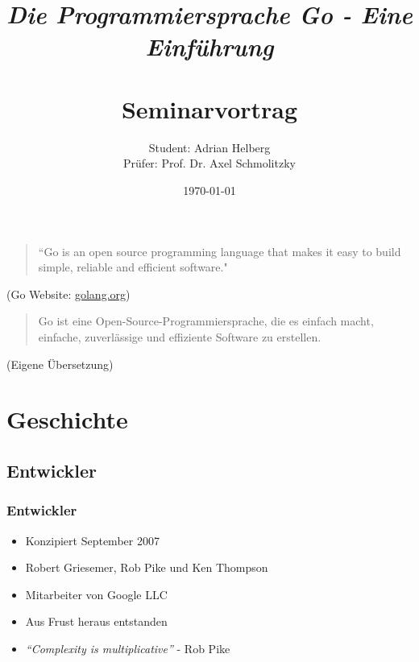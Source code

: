 \documentclass{beamer}
\title{
	\Large{\textit{\\Die Programmiersprache Go - Eine Einf\"uhrung}} \\
	\Large{\textbf{\\Seminarvortrag}}
}
\author{Student: Adrian Helberg \\Prüfer: Prof. Dr. Axel Schmolitzky}
\date{\today}
\begin{document}

\maketitle

\frame{\tableofcontents}

\begin{frame}

\begin{quote}
``Go is an open source programming language that makes it easy to build simple, reliable and efficient software." 
\end{quote}

\begin{flushright}
\scriptsize (Go Website: \href{golang.org}{golang.org})
\end{flushright}

\begin{quote}
Go ist eine Open-Source-Programmiersprache, die es einfach macht, einfache, zuverlässige und effiziente Software zu erstellen.
\end{quote}

\begin{flushright}
\scriptsize (Eigene \"Ubersetzung)
\end{flushright}

\end{frame}


\section{Geschichte}

\subsection{Entwickler}
\begin{frame}
\frametitle{Entwickler}

\begin{itemize}
\setlength{\itemsep}{24pt}
\item Konzipiert September 2007
\item Robert Griesemer, Rob Pike und Ken Thompson
\item Mitarbeiter von Google LLC \textregistered
\item Aus Frust heraus entstanden
\item \textit{``Complexity is multiplicative''} - Rob Pike
\end{itemize}

\end{frame}
\end{document}
